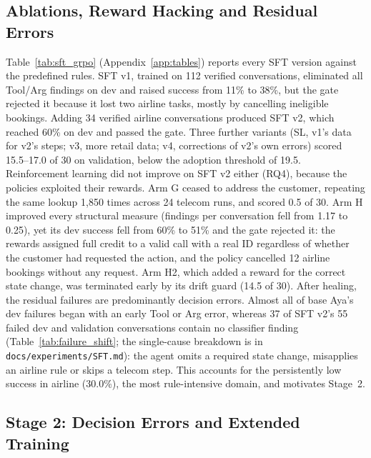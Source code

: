 \documentclass[11pt]{article}
\begin{document}
\subsection{Ablations, Reward Hacking and Residual Errors}
\label{sec:exp_ablations}

Table~\ref{tab:sft_grpo} (Appendix~\ref{app:tables}) reports every SFT version against the predefined rules. SFT v1, trained on 112 verified conversations, eliminated all Tool/Arg findings on dev and raised success from 11\% to 38\%, but the gate rejected it because it lost two airline tasks, mostly by cancelling ineligible bookings. Adding 34 verified airline conversations produced SFT v2, which reached 60\% on dev and passed the gate. Three further variants (SL, v1's data for v2's steps; v3, more retail data; v4, corrections of v2's own errors) scored 15.5--17.0 of 30 on validation, below the adoption threshold of 19.5. Reinforcement learning did not improve on SFT v2 either (RQ4), because the policies exploited their rewards. Arm G ceased to address the customer, repeating the same lookup 1,850 times across 24 telecom runs, and scored 0.5 of 30. Arm H improved every structural measure (findings per conversation fell from 1.17 to 0.25), yet its dev success fell from 60\% to 51\% and the gate rejected it: the rewards assigned full credit to a valid call with a real ID regardless of whether the customer had requested the action, and the policy cancelled 12 airline bookings without any request. Arm H2, which added a reward for the correct state change, was terminated early by its drift guard (14.5 of 30). After healing, the residual failures are predominantly decision errors. Almost all of base Aya's dev failures began with an early Tool or Arg error, whereas 37 of SFT v2's 55 failed dev and validation conversations contain no classifier finding (Table~\ref{tab:failure_shift}; the single-cause breakdown is in \texttt{docs/experiments/SFT.md}): the agent omits a required state change, misapplies an airline rule or skips a telecom step. This accounts for the persistently low success in airline (30.0\%), the most rule-intensive domain, and motivates Stage~2.

\subsection{Stage 2: Decision Errors and Extended Training}
\label{sec:exp_stage2}
\end{document}
